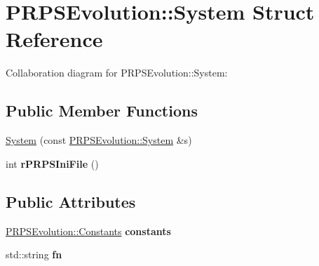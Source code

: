 \hypertarget{struct_p_r_p_s_evolution_1_1_system}{\section{P\-R\-P\-S\-Evolution\-:\-:System Struct Reference}
\label{struct_p_r_p_s_evolution_1_1_system}
}


Collaboration diagram for P\-R\-P\-S\-Evolution\-:\-:System\-:
\subsection*{Public Member Functions}
\begin{DoxyCompactItemize}
\item 
\hyperlink{struct_p_r_p_s_evolution_1_1_system_abcb363b5f2dddb2533fad570083cadcf}{System} (const \hyperlink{struct_p_r_p_s_evolution_1_1_system}{P\-R\-P\-S\-Evolution\-::\-System} \&s)
\item 
\hypertarget{struct_p_r_p_s_evolution_1_1_system_a2caa4b5462af9476d68b0eb8fa7d9023}{int {\bfseries r\-P\-R\-P\-S\-Ini\-File} ()}\label{struct_p_r_p_s_evolution_1_1_system_a2caa4b5462af9476d68b0eb8fa7d9023}

\end{DoxyCompactItemize}
\subsection*{Public Attributes}
\begin{DoxyCompactItemize}
\item 
\hypertarget{struct_p_r_p_s_evolution_1_1_system_a36e61e1634d4b9340fd951c361dfad17}{\hyperlink{struct_p_r_p_s_evolution_1_1_constants}{P\-R\-P\-S\-Evolution\-::\-Constants} {\bfseries constants}}\label{struct_p_r_p_s_evolution_1_1_system_a36e61e1634d4b9340fd951c361dfad17}

\item 
\hypertarget{struct_p_r_p_s_evolution_1_1_system_ad6ef7d4b7551ded9f3d3a3735a0b894e}{std\-::string {\bfseries fn}}\label{struct_p_r_p_s_evolution_1_1_system_ad6ef7d4b7551ded9f3d3a3735a0b894e}

\end{DoxyCompactItemize}


